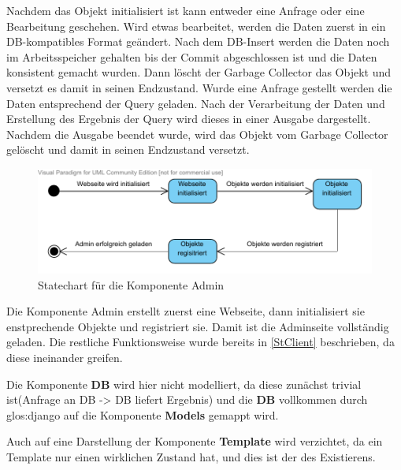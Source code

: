 Nachdem das Objekt initialisiert ist kann entweder eine Anfrage oder eine
Bearbeitung geschehen. Wird etwas bearbeitet, werden die Daten zuerst in ein
DB-kompatibles Format geändert. Nach dem DB-Insert werden die Daten noch im
Arbeitsspeicher gehalten bis der Commit abgeschlossen ist und die Daten
konsistent gemacht wurden. Dann löscht der Garbage Collector das Objekt und
versetzt es damit in seinen Endzustand. Wurde eine Anfrage gestellt werden die 
Daten entsprechend der Query geladen. Nach der Verarbeitung der Daten und 
Erstellung des Ergebnis der Query wird dieses in einer Ausgabe dargestellt. 
Nachdem die Ausgabe beendet wurde, wird das Objekt vom Garbage Collector 
gelöscht und damit in seinen Endzustand versetzt.

\begin{figure}
\includegraphics[width=0.8\linewidth]{bilder/KompAdmin.pdf}
\caption{Statechart für die Komponente Admin}
\label{StAdmin}
\end{figure}

Die Komponente Admin erstellt zuerst eine Webseite, dann initialisiert sie
enstprechende Objekte und registriert sie. Damit ist die Adminseite
vollständig geladen. Die restliche Funktionsweise wurde bereits in
\ref{StClient} beschrieben, da diese ineinander greifen.

Die Komponente \textbf{DB} wird hier nicht modelliert, da diese zunächst trivial ist(Anfrage an DB -> DB liefert Ergebnis) und die \textbf{DB} vollkommen durch \gls{glos:django} auf die Komponente \textbf{Models} gemappt wird.

Auch auf eine Darstellung der Komponente \textbf{Template} wird verzichtet, da ein Template nur einen wirklichen Zustand hat, und dies ist der des Existierens. 






